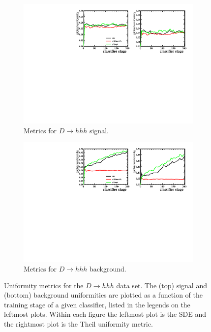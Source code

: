 \begin{figure}[h]
\centering
		\begin{subfigure}[b]{0.48\textwidth}
			\includegraphics[width=\textwidth]{graphs/D23hSignalEffs.pdf}
			\caption{Metrics for $D \to hhh$ signal.}
		\end{subfigure}
		\begin{subfigure}[b]{0.48\textwidth}
			\includegraphics[width=\textwidth]{graphs/D23hBgEffs.pdf}
			\caption{Metrics for $D \to hhh$ background.}
		\end{subfigure}
		\caption{Uniformity metrics for the $D \to hhh$ data set. The (top) signal and (bottom) background uniformities are plotted as a function of the training stage of a given classifier, listed in the legends on the leftmost plots. Within each figure the leftmost plot is the SDE and the rightmost plot is the Theil uniformity metric. \label{fig:d2hhhsdetheil}}
\end{figure}

